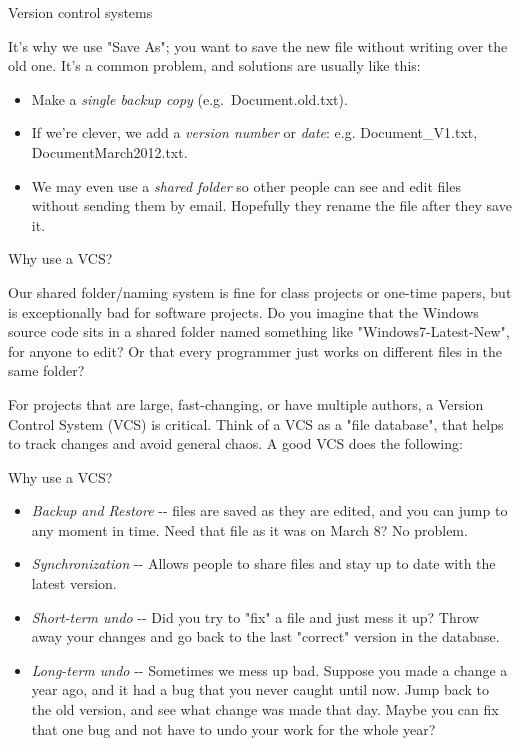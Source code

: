 \documentclass[aspectratio=169]{beamer}
\begin{document}
\begin{frame}{Version control systems}

It's why we use "Save As"; you want to save the new file without writing
over the old one. It's a common problem, and solutions are usually like
this:

\begin{itemize}
\item
  Make a \emph{single backup copy} (e.g.~Document.old.txt).
\item
  If we're clever, we add a \emph{version number} or \emph{date}: e.g.
  Document\_V1.txt, DocumentMarch2012.txt.
\item
  We may even use a \emph{shared folder} so other people can see and
  edit files without sending them by email. Hopefully they rename the
  file after they save it.
\end{itemize}

\end{frame}

\begin{frame}{Why use a VCS?}

Our shared folder/naming system is fine for class projects or one-time
papers, but is exceptionally bad for software projects. Do you imagine
that the Windows source code sits in a shared folder named something
like "Windows7-Latest-New", for anyone to edit? Or that every programmer
just works on different files in the same folder?

For projects that are large, fast-changing, or have multiple authors, a
Version Control System (VCS) is critical. Think of a VCS as a "file
database", that helps to track changes and avoid general chaos. A good
VCS does the following:

\end{frame}

\begin{frame}{Why use a VCS?}

\begin{itemize}
\item
  \emph{Backup and Restore} -\/- files are saved as they are edited, and
  you can jump to any moment in time. Need that file as it was on March
  8? No problem.
\item
  \emph{Synchronization} -\/- Allows people to share files and stay up
  to date with the latest version.
\item
  \emph{Short-term undo} -\/- Did you try to "fix" a file and just mess
  it up? Throw away your changes and go back to the last "correct"
  version in the database.
\item
  \emph{Long-term undo} -\/- Sometimes we mess up bad. Suppose you made
  a change a year ago, and it had a bug that you never caught until now.
  Jump back to the old version, and see what change was made that day.
  Maybe you can fix that one bug and not have to undo your work for the
  whole year?
\end{itemize}
\end{frame}
\end{document}
